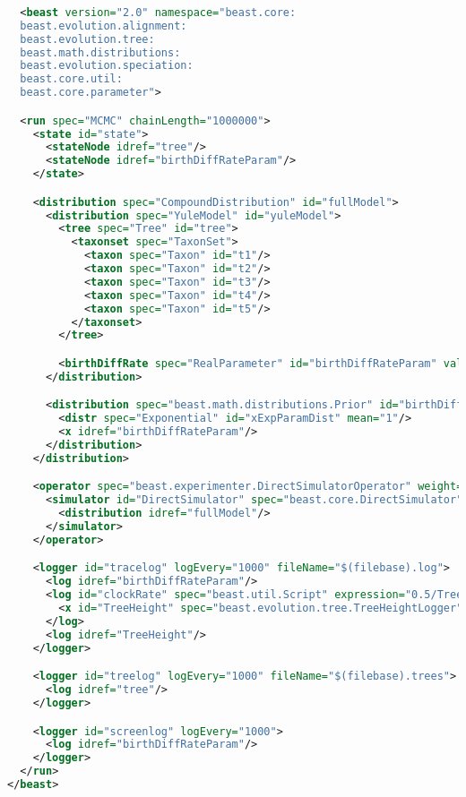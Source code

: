 \documentclass[oneside]{article}
\begin{document}
{\small
\singlespacing
\begin{lstlisting}[language=XML, caption=BEAST 2 control file for
  sampling a distribution under the Yule model with MCMC (using a
  direct simulator as the proposal mechanism)., label={lst:yulemcmc}]
  
  <beast version="2.0" namespace="beast.core:
  beast.evolution.alignment:
  beast.evolution.tree:
  beast.math.distributions:
  beast.evolution.speciation:
  beast.core.util:
  beast.core.parameter">

  <run spec="MCMC" chainLength="1000000">
    <state id="state">
      <stateNode idref="tree"/>
      <stateNode idref="birthDiffRateParam"/>
    </state>

    <distribution spec="CompoundDistribution" id="fullModel">
      <distribution spec="YuleModel" id="yuleModel">
        <tree spec="Tree" id="tree">
          <taxonset spec="TaxonSet">
            <taxon spec="Taxon" id="t1"/>
            <taxon spec="Taxon" id="t2"/>
            <taxon spec="Taxon" id="t3"/>
            <taxon spec="Taxon" id="t4"/>
            <taxon spec="Taxon" id="t5"/>
          </taxonset>
        </tree>

        <birthDiffRate spec="RealParameter" id="birthDiffRateParam" value="1.0"/>
      </distribution>

      <distribution spec="beast.math.distributions.Prior" id="birthDiffRatePrior">
        <distr spec="Exponential" id="xExpParamDist" mean="1"/>
        <x idref="birthDiffRateParam"/>
      </distribution>
    </distribution>

    <operator spec="beast.experimenter.DirectSimulatorOperator" weight="1" state="@state">
      <simulator id="DirectSimulator" spec="beast.core.DirectSimulator" nSamples="1">
        <distribution idref="fullModel"/>
      </simulator>
    </operator>

    <logger id="tracelog" logEvery="1000" fileName="$(filebase).log">
      <log idref="birthDiffRateParam"/>
      <log id="clockRate" spec="beast.util.Script" expression="0.5/TreeHeight">
        <x id="TreeHeight" spec="beast.evolution.tree.TreeHeightLogger" tree="@tree"/>
      </log>
      <log idref="TreeHeight"/>
    </logger>

    <logger id="treelog" logEvery="1000" fileName="$(filebase).trees">
      <log idref="tree"/>
    </logger>

    <logger id="screenlog" logEvery="1000">
      <log idref="birthDiffRateParam"/>
    </logger>
  </run>
</beast>
\end{lstlisting}
}
\end{document}

